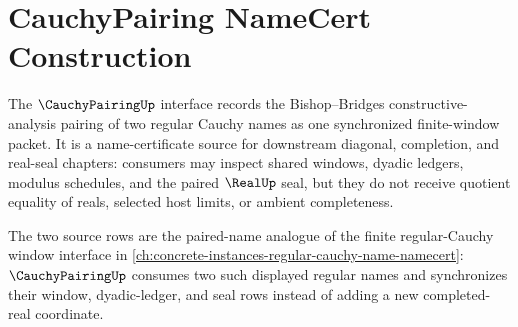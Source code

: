 \chapter{CauchyPairing NameCert Construction}
\label{ch:concrete-instances-cauchypairing-namecert}

The $\CauchyPairingUp$ interface records the Bishop--Bridges constructive-analysis pairing of two regular Cauchy names as one synchronized finite-window packet. It is a name-certificate source for downstream diagonal, completion, and real-seal chapters: consumers may inspect shared windows, dyadic ledgers, modulus schedules, and the paired $\RealUp$ seal, but they do not receive quotient equality of reals, selected host limits, or ambient completeness.

The two source rows are the paired-name analogue of the finite regular-Cauchy window interface in \autoref{ch:concrete-instances-regular-cauchy-name-namecert}: $\CauchyPairingUp$ consumes two such displayed regular names and synchronizes their window, dyadic-ledger, and seal rows instead of adding a new completed-real coordinate.

